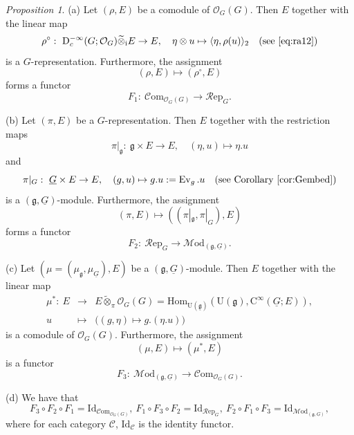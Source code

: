 \documentclass[12pt, a4paper]{amsart}
\newcommand{\CO}{{\mathcal {O}}}
\newcommand{\RC}{{\mathrm {C}}}
\newcommand{\RD}{{\mathrm {D}}}
\newcommand{\RU}{{\mathrm {U}}}
\newcommand{\Hom}{{\mathrm{Hom}}}
\newcommand{\wt}{\widetilde}
\newcommand{\Ev}{\operatorname{Ev}}
\newcommand{\g}{\mathfrak g}
\newcommand{\la}{\langle}
\newcommand{\ra}{\rangle}
\newcommand{\be}{\begin {equation}}
\newcommand{\ee}{\end {equation}}
\theoremstyle{Theorem}
\theoremstyle{Theorem}
\theoremstyle{Theorem}
\theoremstyle{Theorem}
\theoremstyle{Plain}
\theoremstyle{remark}
\theoremstyle{remark}
\theoremstyle{Definition}
\newtheorem{prpd}[dfn]{Proposition}
\numberwithin{equation}{section}
\begin{document}
\begin{prpd}\label{prop:eqMR}
\noindent (a) Let $(\rho,E)$ be a comodule of $\CO_G(G)$. Then  $E$ together with the linear map 
    \be\label{eq:mu*} \rho^{\circ}: \ \RD^{-\infty}_c(G;\CO_G)\wt\otimes_{\mathrm{i}} E\rightarrow E,\quad  \eta\otimes u\mapsto \la\eta,\rho(u)\ra_2\quad\text{(see \eqref{eq:ra12})}\ee is a $G$-representation. Furthermore, the assignment 
    \[(\rho,E)\mapsto(\rho^{\circ},E)\] forms a functor 
    \[F_1:\ \mathcal{C}\mathrm{om}_{\CO_G(G)} \rightarrow\mathcal{R}\mathrm{ep}_G.\]
    
\noindent (b)   Let $(\pi,E)$ be a $G$-representation. Then $E$ together with the restriction maps \be \label{eq:dvarrho}\pi|_{\g}:\ \g\times E\rightarrow E, \quad (\eta,u)\mapsto \eta.u\ee and 
\be \label{eq:linevarrho}\pi|_{G}:\ \underline G\times E\rightarrow E, \quad (g,u)\mapsto g.u:=\Ev_g.u\quad\text{(see Corollary \ref{cor:Gembed})}\ee  is a $(\g,\underline G)$-module. 
 Furthermore, the assignment
    \[(\pi,E)\mapsto((\pi|_{\g},\pi|_{G}),E) %
    \] forms a functor 
    \[F_2:\ \mathcal{R}\mathrm{ep}_G \rightarrow \mathcal{M}\mathrm{od}_{(\g,\underline{G})}.\]


 \noindent  (c)   Let $(\mu = (\mu_{\g}, \mu_{\underline{G}}), E)$ be a $(\mathfrak{g}, \underline{G})$-module. 
    Then $E$ together with the linear map  
     \[
     \begin{array}{rcl}
         \mu^*:\ E &\rightarrow &E \wt{\otimes}_{\pi} \mathcal{O}_G(G)=\Hom_{\RU(\underline{\g})}(\RU(\g),\RC^{\infty}(\underline G;E)),\\  u &\mapsto &\big((g,\eta)\mapsto g.(\eta.u)\big)
     \end{array}
    \] is a comodule of $\mathcal{O}_G(G)$. Furthermore, the assignment
    \begin{equation}\label{eq:assEtogE2}
        (\mu, E) \mapsto (\mu^*, E)
    \end{equation}
    is a functor 
    \[F_3:\ \mathcal{M}\mathrm{od}_{(\g,\underline{G})}\rightarrow \mathcal{C}\mathrm{om}_{\CO_G(G)}.\]

  \noindent(d)
   We have that 
    \[
       F_3 \circ F_2\circ F_1=\mathrm{Id}_{\mathcal{C}\mathrm{om}_{\CO_G(G)}},\ F_1 \circ F_3\circ F_2= \mathrm{Id}_{{\mathcal{R}}\mathrm{ep}_{G}},\ F_2 \circ F_1\circ F_3=\mathrm{Id}_{\mathcal{M}\mathrm{od}_{(\g,\underline{G})}},
    \]  where for each category $\mathcal{C}$, $\mathrm{Id}_{\mathcal{C}}$ is the identity functor. 
\end{prpd}
\end{document}
